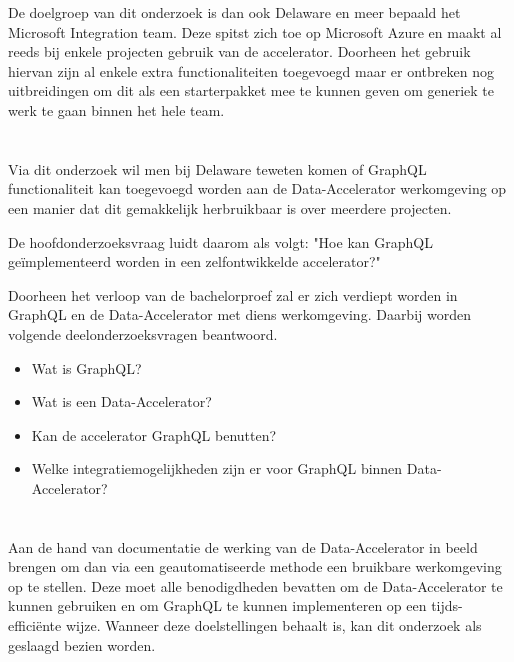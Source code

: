 De doelgroep van dit onderzoek is dan ook Delaware en meer bepaald het Microsoft Integration team. Deze spitst zich toe op Microsoft Azure en maakt al reeds bij enkele projecten gebruik van de accelerator. Doorheen het gebruik hiervan zijn al enkele extra functionaliteiten toegevoegd maar er ontbreken nog uitbreidingen om dit als een starterpakket mee te kunnen geven om generiek te werk te gaan binnen het hele team.

\section{}%
\label{sec:onderzoeksvraag}

Via dit onderzoek wil men bij Delaware teweten komen of GraphQL functionaliteit kan toegevoegd worden aan de Data-Accelerator werkomgeving op een manier dat dit gemakkelijk herbruikbaar is over meerdere projecten.

De hoofdonderzoeksvraag luidt daarom als volgt: "Hoe kan GraphQL geïmplementeerd worden in een zelfontwikkelde accelerator?"

Doorheen het verloop van de bachelorproef zal er zich verdiept worden in GraphQL en de Data-Accelerator met diens werkomgeving. Daarbij worden volgende deelonderzoeksvragen beantwoord.

\begin{itemize}
    \item Wat is GraphQL?
    \item Wat is een Data-Accelerator?
    \item Kan de accelerator GraphQL benutten?
    \item Welke integratiemogelijkheden zijn er voor GraphQL binnen Data-Accelerator?
\end{itemize}

\section{}%
\label{sec:onderzoeksdoelstelling}

Aan de hand van documentatie de werking van de Data-Accelerator in beeld brengen om dan via een geautomatiseerde methode een bruikbare werkomgeving op te stellen. Deze moet alle benodigdheden bevatten om de Data-Accelerator te kunnen gebruiken en om GraphQL te kunnen implementeren op een tijds-efficiënte wijze. Wanneer deze doelstellingen behaalt is, kan dit onderzoek als geslaagd bezien worden.


